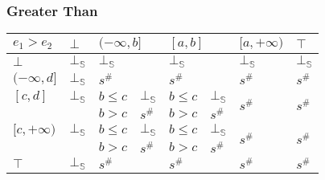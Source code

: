 \documentclass[aspectratio=169]{beamer}
\begin{document}
        \begin{frame}
            \frametitle{Greater Than}
    \begin{table}[]
        \begin{tabular}{|l|l|ll|ll|l|l|}
        \hline
        $e_1 > e_2$    & $\bot$ & \multicolumn{2}{l|}{$(-\infty, b]$} & \multicolumn{2}{l|}{$[a, b]$} & $[a, +\infty)$          & $\top$                  \\ \hline
        $\bot$         & $\bot_\mathbb{S}$ & \multicolumn{2}{l|}{$\bot_\mathbb{S}$}         & \multicolumn{2}{l|}{$\bot_\mathbb{S}$}   & $\bot_\mathbb{S}$                  & $\bot_\mathbb{S}$                  \\ \hline
        $(-\infty, d]$ & $\bot_\mathbb{S}$ & \multicolumn{2}{l|}{$s^\#$}         & \multicolumn{2}{l|}{$s^\#$}   & $s^\#$                  & $s^\#$                  \\ \hline
        $[c, d]$       & $\bot_\mathbb{S}$ & $b \le c$          & $\bot_\mathbb{S}$         & $b \le c$       & $\bot_\mathbb{S}$      & \multirow{2}{*}{$s^\#$} & \multirow{2}{*}{$s^\#$} \\
                        &        & $b > c$            & $s^\#$         & $b > c$         & $s^\#$      &                         &                         \\ \hline
        $[c, +\infty)$ & $\bot_\mathbb{S}$ & $b \le c$          & $\bot_\mathbb{S}$         & $b \le c$       & $\bot_\mathbb{S}$      & \multirow{2}{*}{$s^\#$} & \multirow{2}{*}{$s^\#$} \\
                        &        & $b > c$            & $s^\#$         & $b > c$         & $s^\#$      &                         &                         \\ \hline
        $\top$         & $\bot_\mathbb{S}$ & \multicolumn{2}{l|}{$s^\#$}         & \multicolumn{2}{l|}{$s^\#$}   & $s^\#$                  & $s^\#$                  \\ \hline
        \end{tabular}
        \end{table}
    \end{frame}
    
\end{document}
